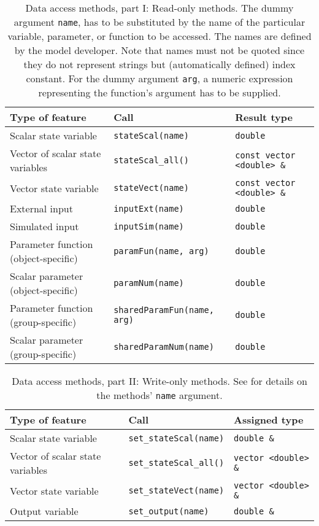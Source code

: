 \begin{table*}[htb]
  \caption[Data access methods, part I: Read-only methods.]{Data access methods, part I: Read-only methods. The dummy argument \texttt{name}, has to be substituted by the name of the particular variable, parameter, or function to be accessed. The names are defined by the model developer. Note that names must not be quoted since they do not represent strings but (automatically defined) index constant. For the dummy argument \texttt{arg}, a numeric expression representing the function's argument has to be supplied. \label{tab:concept-dataAccessFunctions_read}}
  \begin{tabular}{p{}ll} \hline\hline
    Type of feature       & Call                   & Result type \\ \hline
    Scalar state variable & \verb!stateScal(name)! & \verb!double! \\
    Vector of scalar state variables & \verb!stateScal_all()! & \verb!const vector <double> &! \\
    Vector state variable & \verb!stateVect(name)! & \verb!const vector <double> &! \\
    External input    & \verb!inputExt(name)! & \verb!double! \\
    Simulated input   & \verb!inputSim(name)! & \verb!double! \\
    Parameter function (object-specific) & \verb!paramFun(name, arg)! & \verb!double! \\
    Scalar parameter (object-specific) & \verb!paramNum(name)! & \verb!double! \\
    Parameter function (group-specific) & \verb!sharedParamFun(name, arg)! & \verb!double! \\
    Scalar parameter (group-specific) & \verb!sharedParamNum(name)! & \verb!double! \\
    \hline\hline
  \end{tabular}
\end{table*}

\begin{table*}[htb]
  \caption[Data access methods, part II: Write-only methods.]{Data access methods, part II: Write-only methods. See  for details on the methods' \texttt{name} argument. \label{tab:concept-dataAccessFunctions_write}}
  \begin{tabular}{p{}ll} \hline\hline
    Type of feature & Call & Assigned type \\ \hline
    Scalar state variable & \verb!set_stateScal(name)! & \verb!double &! \\
    Vector of scalar state variables & \verb!set_stateScal_all()! & \verb!vector <double> &! \\
    Vector state variable & \verb!set_stateVect(name)! & \verb!vector <double> &! \\
    Output variable & \verb!set_output(name)! & \verb!double &! \\
    \hline\hline
  \end{tabular}
\end{table*}

